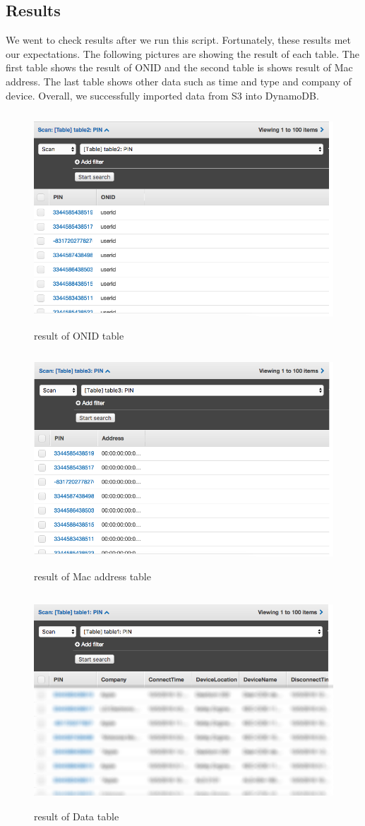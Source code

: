 \subsection{Results}
\noindent We went to check results after we run this script. Fortunately, these results met our expectations. The following pictures are showing the result of each table. The first table shows the result of ONID and the second table is shows result of Mac address. The last table shows other data such as time and type and company of device. Overall, we successfully imported data from S3 into DynamoDB.\\
\begin{figure}[H]
\includegraphics[width=15cm, height=8cm]{ONID.png}
\centering
\caption{result of ONID table}
\end{figure}
\begin{figure}[H]
\includegraphics[width=15cm, height=8cm]{address.png}
\centering
\caption{result of Mac address table}
\end{figure}
\begin{figure}[H]
\includegraphics[width=15cm, height=8cm]{data.png}
\centering
\caption{result of Data table}
\end{figure}